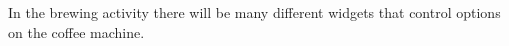 \documentclass[conference]{IEEEtran}
\begin{document}
\par  In the brewing activity there will be many different widgets that control options
on the coffee machine. 


\end{document}

